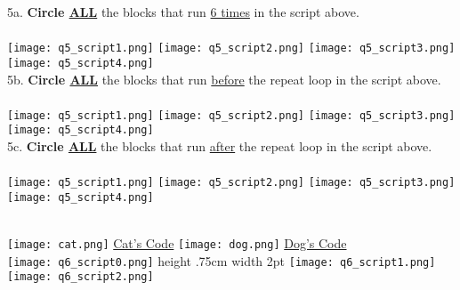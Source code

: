 \noindent 5a. \textbf{Circle \underline{ALL}} the blocks that run \underline{6 times} in the script above. \\ \\
\texttt{[image: q5\_script1.png]} \hspace{1cm}
\texttt{[image: q5\_script2.png]} \hspace{1cm}
\texttt{[image: q5\_script3.png]} \hspace{1cm}
\texttt{[image: q5\_script4.png]} \hspace{1cm}\\

\noindent 5b. \textbf{Circle \underline{ALL}} the blocks that run \underline{before} the repeat loop in the script above. \\ \\
\texttt{[image: q5\_script1.png]} \hspace{1cm}
\texttt{[image: q5\_script2.png]} \hspace{1cm}
\texttt{[image: q5\_script3.png]} \hspace{1cm}
\texttt{[image: q5\_script4.png]} \hspace{1cm}\\

\noindent 5c. \textbf{Circle \underline{ALL}} the blocks that run \underline{after} the repeat loop in the script above. \\ \\
\texttt{[image: q5\_script1.png]} \hspace{1cm}
\texttt{[image: q5\_script2.png]} \hspace{1cm}
\texttt{[image: q5\_script3.png]} \hspace{1cm}
\texttt{[image: q5\_script4.png]} \hspace{1cm}\\

\noindent \dotfill \\

\newpage

\indent \texttt{[image: cat.png]} \underline{Cat's Code} \hspace{5cm}
\texttt{[image: dog.png]} \underline{Dog's Code} \\
\texttt{[image: q6\_script0.png]} \hspace{1cm}
 \vline height .75cm width 2pt \hspace{1cm}
\texttt{[image: q6\_script1.png]} \hspace{1cm}
\texttt{[image: q6\_script2.png]} \\ 

